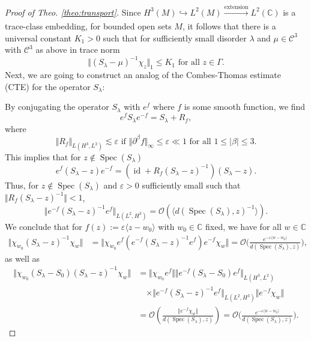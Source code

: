 \documentclass[reqno,12pt,letterpaper]{amsart}
\newcommand{\CC}{{\mathbb C}}
\numberwithin{equation}{section}
\DeclareMathOperator{\Spec}{Spec}
\begin{document}
\begin{proof}[Proof of Theo. \ref{theo:transport}]
Since $H^3(M) \hookrightarrow L^2(M) \xrightarrow[]{\text{extension}}  L^2(\CC) $ is a trace-class embedding, for bounded open sets $M$, it follows that there is a universal constant $K_1>0$ such that for sufficiently small disorder $\lambda$  and $\mu \in \mathcal C^3$ with $\mathcal C^3$ as above in trace norm 
\begin{equation}
\label{eq:trace_norm}
  \Vert (S_{\lambda}-\mu)^{-1} \chi_z \Vert_1 \le K_1 \text{ for all } z \in \Gamma.
  \end{equation}
Next, we are going to construct an analog of the Combes-Thomas estimate (CTE) for the operator $S_{\lambda}$: 

By conjugating the operator $S_{\lambda}$ with $e^f$ where $f$ is some smooth function, we find
\[ e^f S_{\lambda} e^{-f} = S_{\lambda} + R_f,\]
where $$\Vert R_f \Vert_{L(H^3, L^2)} \lesssim \varepsilon \text{ if } \Vert \partial^{\beta} f \Vert_{\infty} \le \varepsilon \ll 1 \text{ for all } 1 \le \vert \beta \vert \le 3.$$
This implies that for $z \notin \Spec(S_{\lambda})$
\[ e^f (S_{\lambda}-z)e^{-f} = (\operatorname{id}+R_f (S_{\lambda}-z)^{-1}) (S_{\lambda}-z).\]
Thus, for $z \notin \Spec(S_{\lambda})$ and $\varepsilon>0$ sufficiently small such that $\Vert R_f (S_{\lambda}-z)^{-1}\Vert <1$, $$\Vert e^{-f} (S_{\lambda}-z)^{-1}e^{f}  \Vert_{L(L^2,H^3)}  = \mathcal O(\langle d(\Spec(S_{\lambda}),z)^{-1}\rangle).$$
We conclude that for $f(z):=\varepsilon \langle z-w_0 \rangle$ with $w_0\in \CC$ fixed, we have for all $w \in \CC$
\begin{equation}
\label{eq:CTE}
\tag{CTE}
\begin{split}
 \Vert \chi_{w_0} (S_{\lambda}-z)^{-1} \chi_w \Vert &= \Vert \chi_{w_0} e^{f} (e^{-f} (S_{\lambda}-z)^{-1}e^{f} ) e^{-f} \chi_w \Vert = \mathcal O\Big(\tfrac{e^{-\varepsilon \langle w-w_0 \rangle }}{d(\Spec(S_{\lambda}),z)}\Big),
\end{split}
\end{equation}
as well as
\begin{equation}
\begin{split}
\Vert \chi_{w_0}(S_{\lambda}-S_0)(S_{\lambda}-z)^{-1} \chi_w \Vert &=\Vert \chi_{w_0} e^{f} \Vert \Vert  e^{-f}(S_{\lambda}-S_0) e^{f} \Vert_{L(H^3,L^2)} \\
& \quad \times \Vert e^{-f} (S_{\lambda}-z)^{-1}e^{f}  \Vert_{L(L^2,H^3)} \Vert  e^{-f} \chi_w \Vert \\
&=\mathcal O( \tfrac{\Vert  e^{-f} \chi_w \Vert}{d(\Spec(S_{\lambda}),z)}) =   \mathcal O\Big(\tfrac{e^{-\varepsilon \langle w-w_0 \rangle }}{d(\Spec(S_{\lambda}),z)}\Big).

\end{split}
\end{equation}
\end{proof}
\end{document}
